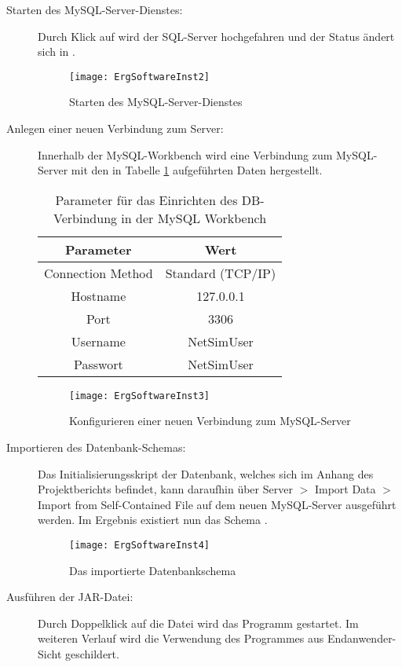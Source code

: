 \begin{description}
\item [Starten des MySQL-Server-Dienstes:]
Durch Klick auf  wird der SQL-Server hochgefahren und der Status ändert sich in .
\begin{figure}[htb]
	\centering
	\texttt{[image: ErgSoftwareInst2]}
	\caption{Starten des MySQL-Server-Dienstes}
	\label{fig:ErgSoftwareInst2}
\end{figure}
\item [Anlegen einer neuen Verbindung zum Server:]
Innerhalb der MySQL-Workbench wird eine Verbindung zum MySQL-Server mit den in Tabelle \ref{tab:mysql} aufgeführten Daten hergestellt.
\begin{table}[htb]
\centering
\caption{Parameter für das Einrichten des DB-Verbindung in der MySQL Workbench}
\label{tab:mysql}
	 \begin{tabular}{cc}
	\textbf{Parameter} & \textbf{Wert}\\
	\hline
	\hline
	Connection Method & Standard (TCP/IP)\\
	 \hline
	Hostname & 127.0.0.1\\
	 \hline
	Port & 3306\\
	 \hline
	Username & NetSimUser\\
	 \hline
	Passwort & NetSimUser\\
	 \end{tabular}
\end{table}
\begin{figure}[htb]
	\centering
	\texttt{[image: ErgSoftwareInst3]}
	\caption{Konfigurieren einer neuen Verbindung zum MySQL-Server}
	\label{fig:ErgSoftwareInst3}
\end{figure}
\item [Importieren des Datenbank-Schemas:] Das Initialisierungsskript der Datenbank, welches sich im Anhang des Projektberichts befindet, kann daraufhin über Server $ > $ Import Data $ > $ Import from Self-Contained File auf dem neuen MySQL-Server ausgeführt werden. Im Ergebnis existiert nun das Schema .
\begin{figure}[htb]
	\centering
	\texttt{[image: ErgSoftwareInst4]}
	\caption{Das importierte Datenbankschema }
	\label{fig:ErgSoftwareInst4}
\end{figure}
\item [Ausführen der JAR-Datei:] Durch Doppelklick auf die Datei  wird das Programm gestartet. Im weiteren Verlauf wird die Verwendung des Programmes aus Endanwender-Sicht geschildert.
\end{description}

